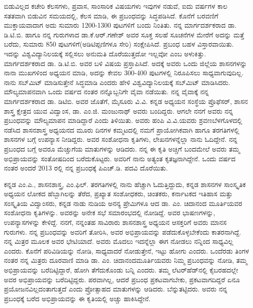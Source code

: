 ಬಿಡುವಿಲ್ಲದ ಕಚೇರಿ ಕೆಲಸಗಳು, ಪ್ರವಾಸ, ಸಾಂಸಾರಿಕ ವಿಷಯಗಳು ಇವುಗಳ ನಡುವೆ, ಐದು ವರ್ಷಗಳ ಕಾಲ ಸತತವಾಗಿ ಬಿಡುವಿನ ಸಮಯದಲ್ಲಿ, ಕೆಲಸ ಮಾಡಿ, ಈ ಪ್ರಬಂಧವನ್ನು ಸಿದ್ಧಪಡಿಸಿದೆ. ಕೊನೆಗೆ ಬರವಣಿಗೆ ಮುಕ್ತಾಯವಾದಾಗ ಅದು ಸುಮಾರು 1200-1300 ಪುಟಗಳಿಗೆ ಬಂದು ನಿಂತಿತು. ನನ್ನ ಮಾರ್ಗದರ್ಶಕರಾದ ಡಾ. ಡಿ.ಟಿ.ಬಿ. ಹಾಗೂ ನನ್ನ ಗುರುಗಳಾದ ಡಾ.ಕೆ.ಆರ್​.ಗಣೇಶ್​ ಅವರ ಸೂಕ್ತ ಸಲಹೆ ಸೂಚನೆಗಳ ಮೇರೆಗೆ ಅದನ್ನು ಮತ್ತೆ ಬರೆದು, ಸುಮಾರು 850 ಪುಟಗಳಿಗೆ(ಅಡಿಟಿಪ್ಪಣಿಗಳೂ ಸೇರಿ) ಸಂಕ್ಷೇಪಿಸಿದೆ. ಪ್ರಬಂಧ ಬಹಳ ವಿಸ್ತಾರವಾಯಿತು. ಇದನ್ನು ವಿಶ್ವವಿದ್ಯಾನಿಲಯಕ್ಕೆ ಸಲ್ಲಿಸಲು ಅನುಮತಿ ದೊರೆಯುತ್ತದೋ ಇಲ್ಲವೋ ಎಂಬ ಅಳುಕಿತ್ತು. ಮಾರ್ಗದರ್ಶಕರಾದ ಡಾ. ಡಿ.ಟಿ.ಬಿ. ಅವರ ಬಳಿ ವಿಷಯ ಪ್ರಸ್ತಾಪಿಸಿದೆ. ಅದಕ್ಕೆ ಅವರು ಒಂದು ಜಿಲ್ಲೆಯ ಶಾಸನಗಳನ್ನು ನಾನಾ ಮುಖಗಳಿಂದ ಅಧ್ಯಯನ ಮಾಡಿ, ಅದನ್ನು ಕೇವಲ 300-400 ಪುಟಗಳಲ್ಲಿ ನಿರೂಪಿಸಲು ಸಾಧ್ಯವಾಗುವುದಿಲ್ಲ. ನಾನು ಸಬ್​ಮಿಟ್​ ಮಾಡಿಸುತ್ತೇನೆ ಸಿದ್ಧಮಾಡಿ ಎಂದರು ಹೇಳಿ ವಿಶ್ವವಿದ್ಯಾನಿಲಯಕ್ಕೆ ಸಬ್​ಮಿಟ್​ ಮಾಡಿಸಿದರು. ಮೌಲ್ಯಮಾಪನವಾಗಿ ಒಂದು ವರ್ಷದ ನಂತರ ನನ್ನೊಬ್ಬನಿಗೇ ವೈವಾ ನಡೆಯಿತು. ನನ್ನ ವೈವಾಕ್ಕೆ ನನ್ನ ಮಾರ್ಗದರ್ಶಕರಾದ ಡಾ. ಡಿಟಿಬಿ. ಅವರ ಜೊತೆಗೆ, ಮೈಸೂರು ವಿ.ವಿ. ಕನ್ನಡ ಅಧ್ಯಯನ ಸಂಸ್ಥೆಯ ಪ್ರೊಫೆಸರ್​, ಶಾಸನ ಶಾಸ್ತ್ರ ಕ್ಷೇತ್ರದ ಯುವ ವಿದ್ವಾಂಸ, ಡಾ. ಎಂ.ಜಿ. ಮಂಜುನಾಥ್​ ಅವರು ಬಂದಿದ್ದರು. ಆಗಲೇ ನನಗೆ ಅವರು ನನ್ನ ಪ್ರಬಂಧವನ್ನು ಮೌಲ್ಯಮಾಪನ ಮಾಡಿದ್ದಾರೆ ಎಂದು ತಿಳಿಯಿತು. ಅವರು ಹಂಪಿ ವಿ.ವಿ.ಯವರು ಶ್ರವಣಬೆಳಗೊಳದಲ್ಲಿ ನಡೆಸಿದ ಶಾಸನಶಾಸ್ತ್ರ ಅಧ್ಯಯನದ ಮೂರು ದಿನಗಳ ಕಮ್ಮಟದಲ್ಲಿ ನಮಗೆ ಪ್ರಾಯೋಗಿಕವಾಗಿ ಹಾಗೂ ತರಗತಿಗಳಲ್ಲಿ ಶಾಸನಗಳ ಬಗ್ಗೆ ಉಪನ್ಯಾಸ ನೀಡಿದ್ದರು. ಅವರ ಸಂಶೋಧನಾ ಕೃತಿಗಳು, ಲೇಖನಗಳನ್ನೆಲ್ಲಾ ನಾನು ಓದಿದ್ದೇನೆ. ನನ್ನ ಪ್ರಬಂಧದ ಬಗ್ಗೆ ಅವರೂ ಮೆಚ್ಚುಗೆಯ ಮಾತುಗಳನ್ನು ಆಡಿದರು. ನನ್ನ ಈ ಕೃತಿ ಅಚ್ಚಿಗೆ ಬಂದಮೇಲೆ ಅವರು ತಮ್ಮ ಅಭಿಪ್ರಾಯವನ್ನು ಸಂತೋಷದಿಂದ ಬರೆದುಕೊಟ್ಟರು. ಅವರಿಗೆ ನಾನು ಅತ್ಯಂತ ಕೃತಜ್ಞನಾಗಿದ್ದೇನೆ. ಒಂದು ವರ್ಷದ ನಂತರ ಅಂದರೆ 2013 ರಲ್ಲಿ ನನ್ನ ಪ್ರಬಂಧಕ್ಕೆ ಪಿಎಚ್​.ಡಿ. ಪದವಿ ದೊರೆಯಿತು.

ಕನ್ನಡ ಎಂ.ಎ., ಶಾಸನಶಾಸ್ತ್ರ, ಎಂ.ಫಿಲ್​. ತರಗತಿಗಳಲ್ಲಿ ನಾನು ಹೆಚ್ಚಾಗಿ ಓದುತ್ತಿದ್ದುದು, ಕನ್ನಡ ಶಾಸನಗಳ ಸಾಂಸ್ಕೃತಿಕ ಅಧ್ಯಯನ ಲೋಕದ ಹೆಬ್ಬಾಗಿಲನ್ನು ತೆರೆದ, ಪ್ರಖ್ಯಾತ ಸಂಶೋಧಕರು, ಚಿಂತಕರು, ಕರ್ನಾಟಕದ ಇತಿಹಾಸ ಮತ್ತು ಸಂಸ್ಕೃತಿಯ ವಿದ್ವಾಂಸರು, ಕನ್ನಡ ನಾಡು ನುಡಿಯ ಅನನ್ಯ ಪ್ರೇಮಿಗಳೂ ಆದ ಡಾ. ಎಂ. ಚಿದಾನಂದ ಮೂರ್ತಿಯವರ ಸಂಶೋಧನಾ ಕೃತಿಗಳನ್ನು. ಅವರನ್ನು ಅನೇಕ ಸಭೆ ಸಮಾರಂಭದಲ್ಲಿ ನೋಡಿದ್ದೆ. ಅವರ ಭಾಷಣಗಳನ್ನು, ಉಪನ್ಯಾಸಗಳನ್ನು ಕೇಳಿದ್ದೆ. ನನಗೆ, ನನ್ನಂತಹ ಸಾವಿರಾರು ಶಾಸನಶಾಸ್ತ್ರ ಅಧ್ಯಯನ ಆಸಕ್ತರಿಗೆ ಅವರು ಮಾನಸ ಗುರುಗಳು. ನನ್ನ ಪ್ರಬಂಧವನ್ನು ಅವರಿಗೆ ತೋರಿಸಿ, ಅವರ ಅಭಿಪ್ರಾಯವನ್ನು ಪಡೆದುಕೊಳ್ಳಬೇಕೆಂದು ಕಾತರನಾಗಿದ್ದೆ. ನನ್ನ ಮಿತ್ರರ ಮೂಲಕ ಅವರ ಭೇಟಿಯಾದೆ. ಅವರು ಮೊದಲು ಇದನ್ನೆಲ್ಲಾ ಈಗ ನೋಡಲು ನನ್ನಿಂದ ಸಾಧ್ಯವಿಲ್ಲ ಎಂದರು. ಕೊನೆಗೆ ಪರಿವಿಡಿಯನ್ನು ನೋಡಿ, ಸಾಧ್ಯವಾದರೆ ನೋಡುತ್ತೇನೆ, ಇಟ್ಟು ಹೋಗು ಎಂದರು. ಒಂದೆರಡು ತಿಂಗಳ ನಂತರ ನನ್ನ ಮಿತ್ರರು ದೂರವಾಣಿ ಮಾಡಿ ಡಾ. ಎಂ. ಚಿದಾನಂದಮೂರ್ತಿಯವರು ನಿಮ್ಮ ಪ್ರಬಂಧವನ್ನು ನೋಡಿ, ತಮ್ಮ ಅಭಿಪ್ರಾಯವನ್ನು ಬರೆದಿಟ್ಟಿದ್ದಾರೆ, ಹೋಗಿ ತೆಗೆದುಕೊಂಡು ಬನ್ನಿ ಎಂದರು. ತಮ್ಮ ಲೆಟರ್​ಹೆಡ್​ನಲ್ಲಿ ಕೈಬರಹದಲ್ಲೇ ಅವರ ಅಭಿಪ್ರಾಯವನ್ನು ಬರೆದಿಟ್ಟಿದ್ದರು. ಪರವಾಗಿಲ್ಲ, ಆದರೆ ಪ್ರಬಂಧ ಪ್ರಕಟವಾಗಬೇಕು, ಪ್ರಕಟವಾಗದಿದ್ದರೆ ಏನೂ ಪ್ರಯೋಜನವಿಲ್ಲದಂತಾಗುತ್ತದೆ ಎಂದು ಪ್ರೋತ್ಸಾಹದ ಮಾತುಗಳನ್ನು ಆಡಿದರು. ಬೆನ್ನುತಟ್ಟಿದರು. ಅವರು ನನ್ನ ಪ್ರಬಂಧಕ್ಕೆ ಬರೆದ ಅಭಿಪ್ರಾಯವನ್ನು ಈ ಕೃತಿಯಲ್ಲಿ ಅಚ್ಚು ಹಾಕಿಸಿದ್ದೇನೆ.

